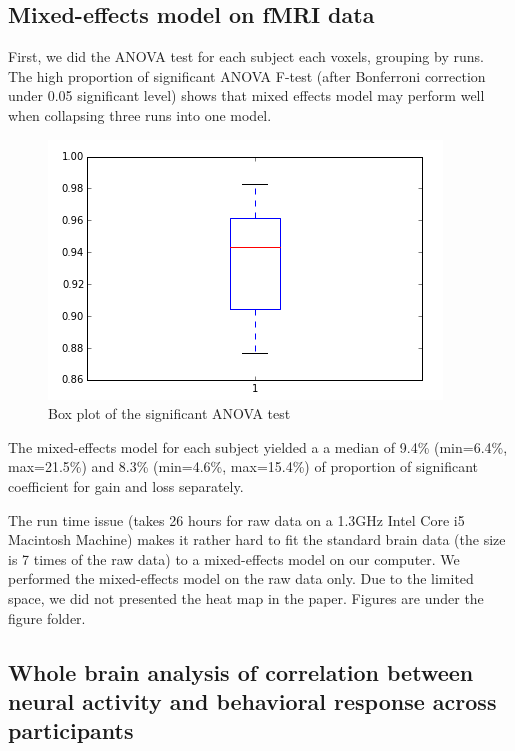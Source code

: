 \documentclass[11pt]{article}
\begin{document}
\subsection{Mixed-effects model on fMRI data}
First, we did the ANOVA test for each subject each voxels, grouping by runs. 
The high proportion of significant ANOVA F-test (after Bonferroni correction 
under 0.05 significant level) shows that mixed effects model may perform well 
when collapsing three runs into one model. 
\begin{figure}[H]
    \centering
        \includegraphics[scale=0.45]{figures/anova_prop.png}
\caption{Box plot of the significant ANOVA test}
\end{figure}
The mixed-effects model for each subject yielded a a median of 9.4\% (min=6.4\%, 
max=21.5\%) and 8.3\% (min=4.6\%, max=15.4\%) of proportion of significant 
coefficient for gain and loss separately. 

The run time issue (takes 26 hours for raw data on a 1.3GHz Intel Core i5 Macintosh Machine) makes it rather hard to fit the standard brain data (the size is 7 times of the raw data) to a mixed-effects model on our computer. We performed the mixed-effects model on the raw data only. Due to the limited space, we did not presented the heat map in the paper. Figures are under the figure folder.

\newpage

\subsection{Whole brain analysis of correlation between neural activity and behavioral response across participants}
\end{document}
